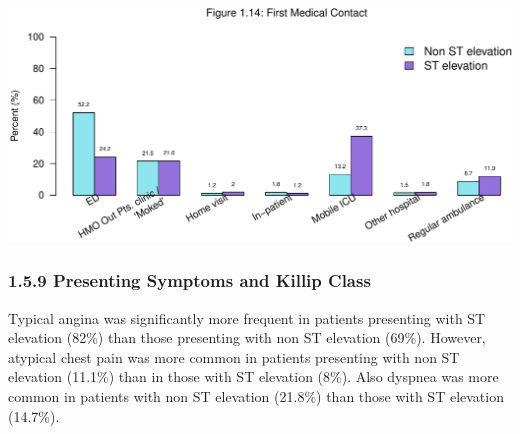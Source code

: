 \documentclass[
]{article}
\begin{document}
\includegraphics{ACSIS_2024_v1_pdf_files/figure-latex/unnamed-chunk-48-1.pdf}

\pagebreak

\subsubsection{1.5.9 Presenting Symptoms and Killip
Class}\label{presenting-symptoms-and-killip-class}

Typical angina was significantly more frequent in patients presenting
with ST elevation (82\%) than those presenting with non ST elevation
(69\%). However, atypical chest pain was more common in patients
presenting with non ST elevation (11.1\%) than in those with ST
elevation (8\%). Also dyspnea was more common in patients with non ST
elevation (21.8\%) than those with ST elevation (14.7\%).

~
\end{document}
